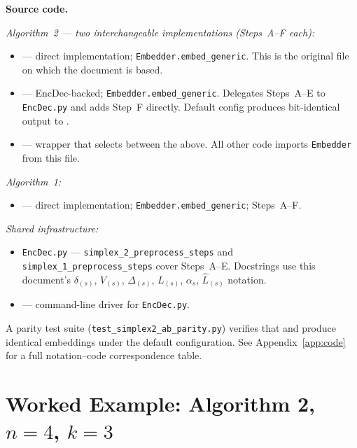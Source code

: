\documentclass[11pt,a4paper]{article}
\newcommand{\encdecpy}{\texttt{EncDec.py}}
\begin{document}
\begin{tcolorbox}[keybox]
\textbf{Source code.}

\smallskip
\noindent\textit{Algorithm~2 — two interchangeable implementations (Steps~A--F each):}
\begin{itemize}[nosep,leftmargin=1.5em,topsep=2pt]
  \item \algtwoapy{} — direct implementation; \texttt{Embedder.embed\_generic}.
    This is the original file on which the document is based.
  \item \algtwobpy{} — EncDec-backed; \texttt{Embedder.embed\_generic}.
    Delegates Steps~A--E to \encdecpy{} and adds Step~F directly.
    Default config produces bit-identical output to \algtwoapy{}.
  \item \algtwopy{} — wrapper that selects between the above.
    All other code imports \texttt{Embedder} from this file.
\end{itemize}

\smallskip
\noindent\textit{Algorithm~1:}
\begin{itemize}[nosep,leftmargin=1.5em,topsep=2pt]
  \item \algonepy{} — direct implementation; \texttt{Embedder.embed\_generic}; Steps~A--F.
\end{itemize}

\smallskip
\noindent\textit{Shared infrastructure:}
\begin{itemize}[nosep,leftmargin=1.5em,topsep=2pt]
  \item \encdecpy{} — \texttt{simplex\_2\_preprocess\_steps} and
    \texttt{simplex\_1\_preprocess\_steps} cover Steps~A--E.
    Docstrings use this document's $\delta_{(s)}$, $V_{(s)}$, $\Delta_{(s)}$,
    $L_{(s)}$, $\alpha_s$, $\hat{L}_{(s)}$ notation.
  \item \playpy{} — command-line driver for \encdecpy{}.
\end{itemize}

\smallskip
\noindent A parity test suite
(\texttt{test\_simplex2\_ab\_parity.py}) verifies that \algtwoapy{} and
\algtwobpy{} produce identical embeddings under the default configuration.
See Appendix~\ref{app:code} for a full notation--code correspondence table.
\end{tcolorbox}

\section{Worked Example: Algorithm 2, $n=4$, $k=3$}
\label{sec:example-alg2}
\end{document}
